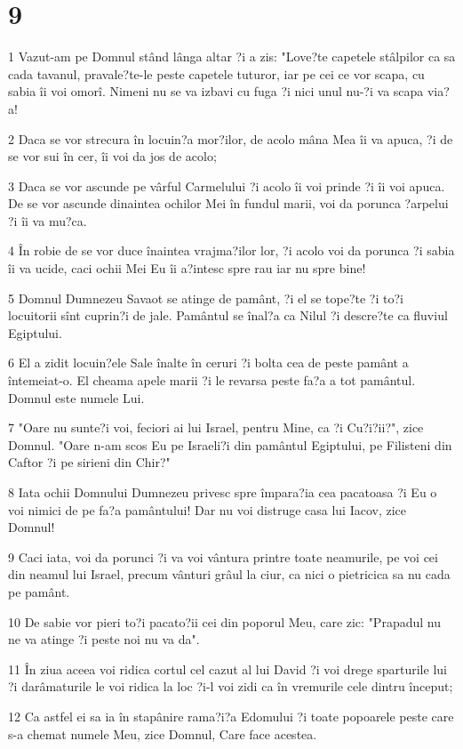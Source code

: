 \chapter{9}

\par 1 Vazut-am pe Domnul stând lânga altar ?i a zis: "Love?te capetele stâlpilor ca sa cada tavanul, pravale?te-le peste capetele tuturor, iar pe cei ce vor scapa, cu sabia îi voi omorî. Nimeni nu se va izbavi cu fuga ?i nici unul nu-?i va scapa via?a!
\par 2 Daca se vor strecura în locuin?a mor?ilor, de acolo mâna Mea îi va apuca, ?i de se vor sui în cer, îi voi da jos de acolo;
\par 3 Daca se vor ascunde pe vârful Carmelului ?i acolo îi voi prinde ?i îi voi apuca. De se vor ascunde dinaintea ochilor Mei în fundul marii, voi da porunca ?arpelui ?i îi va mu?ca.
\par 4 În robie de se vor duce înaintea vrajma?ilor lor, ?i acolo voi da porunca ?i sabia îi va ucide, caci ochii Mei Eu îi a?intesc spre rau iar nu spre bine!
\par 5 Domnul Dumnezeu Savaot se atinge de pamânt, ?i el se tope?te ?i to?i locuitorii sînt cuprin?i de jale. Pamântul se înal?a ca Nilul ?i descre?te ca fluviul Egiptului.
\par 6 El a zidit locuin?ele Sale înalte în ceruri ?i bolta cea de peste pamânt a întemeiat-o. El cheama apele marii ?i le revarsa peste fa?a a tot pamântul. Domnul este numele Lui.
\par 7 "Oare nu sunte?i voi, feciori ai lui Israel, pentru Mine, ca ?i Cu?i?ii?", zice Domnul. "Oare n-am scos Eu pe Israeli?i din pamântul Egiptului, pe Filisteni din Caftor ?i pe sirieni din Chir?"
\par 8 Iata ochii Domnului Dumnezeu privesc spre împara?ia cea pacatoasa ?i Eu o voi nimici de pe fa?a pamântului! Dar nu voi distruge casa lui Iacov, zice Domnul!
\par 9 Caci iata, voi da porunci ?i va voi vântura printre toate neamurile, pe voi cei din neamul lui Israel, precum vânturi grâul la ciur, ca nici o pietricica sa nu cada pe pamânt.
\par 10 De sabie vor pieri to?i pacato?ii cei din poporul Meu, care zic: "Prapadul nu ne va atinge ?i peste noi nu va da".
\par 11 În ziua aceea voi ridica cortul cel cazut al lui David ?i voi drege sparturile lui ?i darâmaturile le voi ridica la loc ?i-l voi zidi ca în vremurile cele dintru început;
\par 12 Ca astfel ei sa ia în stapânire rama?i?a Edomului ?i toate popoarele peste care s-a chemat numele Meu, zice Domnul, Care face acestea.
